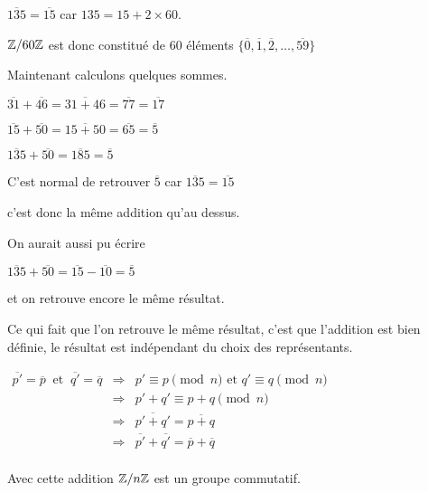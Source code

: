 $\overline{135} = \overline{15}$ car $135 = 15 + 2\times 60$.

\change

$\mathbb{Z}/60\mathbb{Z}$ est donc constitué de $60$ éléments 
$\big\{\overline{0},\overline{1},\overline{2},\ldots,\overline{59}\big\}$

\change

Maintenant calculons quelques sommes.

$\overline{31} + \overline{46}  = \overline{31 + 46} =\overline{77} = \overline{17}$

\change

$\overline{15} + \overline{50}  = \overline{15 + 50} =\overline{65} = \overline{5}$


\change

  $\overline{135}+\overline{50} = \overline{185} = \overline{5}$

C'est normal de retrouver $\overline 5$ car $\overline{135}=\overline{15}$

c'est donc la même addition qu'au dessus.

\change

On aurait aussi pu écrire 

$\overline{135}+\overline{50} = \overline{15} - \overline{10} = \overline{5}$

et on retrouve encore le même résultat.

\change

Ce qui fait que l'on retrouve le même résultat, c'est que l'addition est bien définie,
le résultat est indépendant du choix des représentants.

\change

$\begin{array}{rcl}
 \overline{p'}= \overline p \ \text{ et } \ \overline{q'} = \overline q 
    & \Rightarrow & p' \equiv p \pmod n \text{ et } q' \equiv q \pmod n \\
    & \Rightarrow & p'+q' \equiv p+q \pmod n \\
    & \Rightarrow & \overline{p'+q'} = \overline{p+q} \\
    & \Rightarrow & \overline{p'}+\overline{q'} = \overline p + \overline q \\
\end{array}
$


\diapo

Avec cette addition $\mathbb{Z}/n\mathbb{Z}$ est un groupe commutatif.

\change

